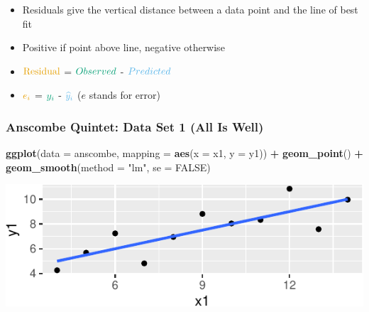 \documentclass[14pt]{extarticle}
\newenvironment{Shaded}{\begin{snugshade}}{\end{snugshade}}
\newcommand{\KeywordTok}[1]{\textcolor[rgb]{0.13,0.29,0.53}{\textbf{#1}}}
\newcommand{\DataTypeTok}[1]{\textcolor[rgb]{0.13,0.29,0.53}{#1}}
\newcommand{\StringTok}[1]{\textcolor[rgb]{0.31,0.60,0.02}{#1}}
\newcommand{\OtherTok}[1]{\textcolor[rgb]{0.56,0.35,0.01}{#1}}
\newcommand{\OperatorTok}[1]{\textcolor[rgb]{0.81,0.36,0.00}{\textbf{#1}}}
\newcommand{\NormalTok}[1]{#1}
\begin{document}
\begin{itemize}
\item
  Residuals give the vertical distance between a data point and the line
  of best fit
\item
  Positive if point above line, negative otherwise
\item
  \(\definecolor{residual}{RGB}{230,159,0}\color{residual}\text{Residual}\)
  = \(\definecolor{observed}{RGB}{0,158,115}\color{observed}Observed\) -
  \(\definecolor{predicted}{RGB}{86,180,233}\color{predicted}Predicted\)
\item
  \(\definecolor{residual}{RGB}{230,159,0}\color{residual}e_i\) =
  \(\definecolor{observed}{RGB}{0,158,115}\color{observed}y_i\) -
  \(\definecolor{predicted}{RGB}{86,180,233}\color{predicted}\widehat{y}_i\)
  (\(e\) stands for error)
\end{itemize}

\newpage

\subsubsection{Anscombe Quintet: Data Set 1 (All Is
Well)}\label{anscombe-quintet-data-set-1-all-is-well}

\begin{Shaded}
\begin{Highlighting}[]
\KeywordTok{ggplot}\NormalTok{(}\DataTypeTok{data =}\NormalTok{ anscombe, }\DataTypeTok{mapping =} \KeywordTok{aes}\NormalTok{(}\DataTypeTok{x =}\NormalTok{ x1, }\DataTypeTok{y =}\NormalTok{ y1)) }\OperatorTok{+}
\StringTok{  }\KeywordTok{geom_point}\NormalTok{() }\OperatorTok{+}
\StringTok{  }\KeywordTok{geom_smooth}\NormalTok{(}\DataTypeTok{method =} \StringTok{"lm"}\NormalTok{, }\DataTypeTok{se =} \OtherTok{FALSE}\NormalTok{)}
\end{Highlighting}
\end{Shaded}

\includegraphics{20181112_anscombe_residuals_files/figure-latex/unnamed-chunk-3-1.pdf}
\end{document}
